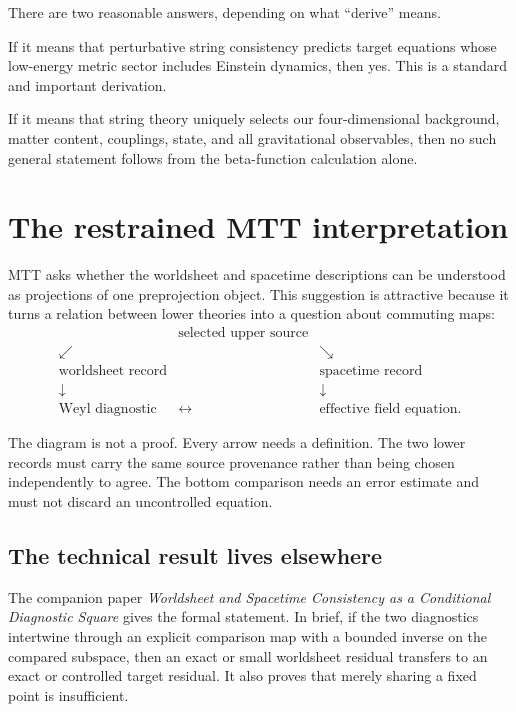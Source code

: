 \documentclass[11pt]{article}
\begin{document}
There are two reasonable answers, depending on what ``derive'' means.

If it means that perturbative string consistency predicts target equations
whose low-energy metric sector includes Einstein dynamics, then yes.  This is
a standard and important derivation.

If it means that string theory uniquely selects our four-dimensional
background, matter content, couplings, state, and all gravitational
observables, then no such general statement follows from the beta-function
calculation alone.

\section{The restrained MTT interpretation}

MTT asks whether the worldsheet and spacetime descriptions can be understood
as projections of one preprojection object.  This suggestion is attractive
because it turns a relation between lower theories into a question about
commuting maps:
\[
\begin{array}{ccc}
&\text{selected upper source}&\\
\swarrow&&\searrow\\
\text{worldsheet record}&&\text{spacetime record}\\
\downarrow&&\downarrow\\
\text{Weyl diagnostic}&\longleftrightarrow&
\text{effective field equation}.
\end{array}
\]

The diagram is not a proof.  Every arrow needs a definition.  The two lower
records must carry the same source provenance rather than being chosen
independently to agree.  The bottom comparison needs an error estimate and
must not discard an uncontrolled equation.

\subsection{The technical result lives elsewhere}

The companion paper
\emph{Worldsheet and Spacetime Consistency as a Conditional Diagnostic
Square} gives the formal statement.  In brief, if the two diagnostics
intertwine through an explicit comparison map with a bounded inverse on the
compared subspace, then an exact or small worldsheet residual transfers to an
exact or controlled target residual.  It also proves that merely sharing a
fixed point is insufficient.
\end{document}
